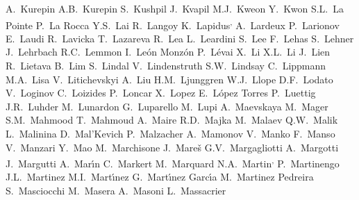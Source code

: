 \begin{flushleft}
A.~Kurepin\And 
A.B.~Kurepin\And 
S.~Kushpil\And 
J.~Kvapil\And 
M.J.~Kweon\And 
Y.~Kwon\And 
S.L.~La Pointe\And 
P.~La Rocca\And 
Y.S.~Lai\And 
R.~Langoy\And 
K.~Lapidus\textsuperscript{,}\And 
A.~Lardeux\And 
P.~Larionov\And 
E.~Laudi\And 
R.~Lavicka\And 
T.~Lazareva\And 
R.~Lea\And 
L.~Leardini\And 
S.~Lee\And 
F.~Lehas\And 
S.~Lehner\And 
J.~Lehrbach\And 
R.C.~Lemmon\And 
I.~Le\'{o}n Monz\'{o}n\And 
P.~L\'{e}vai\And 
X.~Li\And 
X.L.~Li\And 
J.~Lien\And 
R.~Lietava\And 
B.~Lim\And 
S.~Lindal\And 
V.~Lindenstruth\And 
S.W.~Lindsay\And 
C.~Lippmann\And 
M.A.~Lisa\And 
V.~Litichevskyi\And 
A.~Liu\And 
H.M.~Ljunggren\And 
W.J.~Llope\And 
D.F.~Lodato\And 
V.~Loginov\And 
C.~Loizides\And 
P.~Loncar\And 
X.~Lopez\And 
E.~L\'{o}pez Torres\And 
P.~Luettig\And 
J.R.~Luhder\And 
M.~Lunardon\And 
G.~Luparello\And 
M.~Lupi\And 
A.~Maevskaya\And 
M.~Mager\And 
S.M.~Mahmood\And 
T.~Mahmoud\And 
A.~Maire\And 
R.D.~Majka\And 
M.~Malaev\And 
Q.W.~Malik\And 
L.~Malinina\And 
D.~Mal'Kevich\And 
P.~Malzacher\And 
A.~Mamonov\And 
V.~Manko\And 
F.~Manso\And 
V.~Manzari\And 
Y.~Mao\And 
M.~Marchisone\And 
J.~Mare\v{s}\And 
G.V.~Margagliotti\And 
A.~Margotti\And 
J.~Margutti\And 
A.~Mar\'{\i}n\And 
C.~Markert\And 
M.~Marquard\And 
N.A.~Martin\textsuperscript{,}\And 
P.~Martinengo\And 
J.L.~Martinez\And 
M.I.~Mart\'{\i}nez\And 
G.~Mart\'{\i}nez Garc\'{\i}a\And 
M.~Martinez Pedreira\And 
S.~Masciocchi\And 
M.~Masera\And 
A.~Masoni\And 
L.~Massacrier\And 

\end{flushleft}
